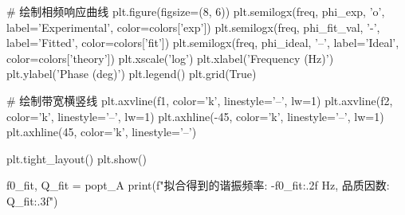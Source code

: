 \documentclass[UTF8]{ctexart}
\begin{document}
\begin{python}
# 绘制相频响应曲线
plt.figure(figsize=(8, 6))
plt.semilogx(freq, phi_exp, 'o', label='Experimental', color=colors['exp'])
plt.semilogx(freq, phi_fit_val, '-', label='Fitted', color=colors['fit'])
plt.semilogx(freq, phi_ideal, '--', label='Ideal', color=colors['theory'])
plt.xscale('log')
plt.xlabel('Frequency (Hz)')
plt.ylabel('Phase (deg)')
plt.legend()
plt.grid(True)

# 绘制带宽横竖线
plt.axvline(f1, color='k', linestyle='--', lw=1)
plt.axvline(f2, color='k', linestyle='--', lw=1)
plt.axhline(-45, color='k', linestyle='--', lw=1)
plt.axhline(45, color='k', linestyle='--')

plt.tight_layout()
plt.show()


f0_fit, Q_fit = popt_A
print(f"拟合得到的谐振频率: {-f0_fit:.2f} Hz, 品质因数: {Q_fit:.3f}")
\end{python}
\end{document}
